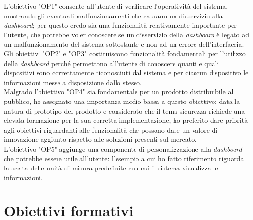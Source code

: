 L'obiettivo "OP1" consente all'utente di verificare l'operatività del sistema, mostrando gli eventuali malfunzionamenti che causano un disservizio alla \emph{dashboard}; per questo credo sia una funzionalità relativamente importante per l'utente, che potrebbe voler conoscere se un disservizio della \emph{dashboard} è legato ad un malfunzionamento del sistema sottostante e non ad un errore dell'interfaccia. \\

Gli obiettivi "OP2" e "OP3" costituiscono funzionalità fondamentali per l'utilizzo della \emph{dashboard} perché permettono all'utente di conoscere quanti e quali dispositivi sono correttamente riconosciuti dal sistema e per ciascun dispositivo le informazioni messe a disposizione dallo stesso. \\

Malgrado l'obiettivo "OP4" sia fondamentale per un prodotto distribuibile al pubblico, ho assegnato una importanza medio-bassa a questo obiettivo: data la natura di prototipo del prodotto e considerato che il tema sicurezza richiede una elevata formazione per la sua corretta implementazione, ho preferito dare priorità agli obiettivi riguardanti alle funzionalità che possono dare un valore di innovazione aggiunto rispetto alle soluzioni presenti sul mercato. \\

L'obiettivo "OP5" aggiunge una componente di personalizzazione alla \emph{dashboard} che potrebbe essere utile all'utente: l'esempio a cui ho fatto riferimento riguarda la scelta delle unità di misura predefinite con cui il sistema visualizza le informazioni. \\

\section{Obiettivi formativi}

